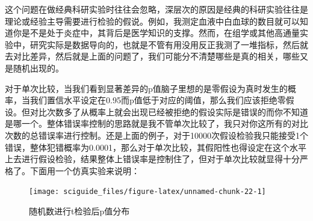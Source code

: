 \documentclass[]{tufte-book}
\newenvironment{Shaded}{}{}
\newcommand{\AttributeTok}[1]{\textcolor[rgb]{0.49,0.56,0.16}{#1}}
\newcommand{\CommentTok}[1]{\textcolor[rgb]{0.38,0.63,0.69}{\textit{#1}}}
\newcommand{\ConstantTok}[1]{\textcolor[rgb]{0.53,0.00,0.00}{#1}}
\newcommand{\ControlFlowTok}[1]{\textcolor[rgb]{0.00,0.44,0.13}{\textbf{#1}}}
\newcommand{\DecValTok}[1]{\textcolor[rgb]{0.25,0.63,0.44}{#1}}
\newcommand{\FunctionTok}[1]{\textcolor[rgb]{0.02,0.16,0.49}{#1}}
\newcommand{\NormalTok}[1]{#1}
\newcommand{\OtherTok}[1]{\textcolor[rgb]{0.00,0.44,0.13}{#1}}
\newcommand{\SpecialCharTok}[1]{\textcolor[rgb]{0.25,0.44,0.63}{#1}}
\newcommand{\StringTok}[1]{\textcolor[rgb]{0.25,0.44,0.63}{#1}}
\begin{document}
这个问题在做经典科研实验时往往会忽略，深层次的原因是经典的科研实验往往是理论或经验主导需要进行检验的假说。例如，我测定血液中白血球的数目就可以知道你是不是处于炎症中，其背后是医学知识的支撑。然而，在组学或其他高通量实验中，研究实际是数据导向的，也就是不管有用没用反正我测了一堆指标，然后就去对比差异，然后就是上面的问题了，我们可能分不清楚哪些是真的相关，哪些又是随机出现的。

对于单次比较，当我们看到显著差异的p值脑子里想的是零假设为真时发生的概率，当我们置信水平设定在0.95而p值低于对应的阈值，那么我们应该拒绝零假设。但对比次数多了从概率上就会出现已经被拒绝的假设实际是错误的而你不知道是哪一个。整体错误率控制的思路就是我不管单次比较了，我只对你这所有的对比次数的总错误率进行控制。还是上面的例子，对于10000次假设检验我只能接受1个错误，整体犯错概率为0.0001，那么对于单次比较，其假阳性也得设定在这个水平上去进行假设检验，结果整体上错误率是控制住了，但对于单次比较就显得十分严格了。下面用一个仿真实验来说明：

\begin{Shaded}
\end{Shaded}

\begin{figure}
\texttt{[image: sciguide\_files/figure-latex/unnamed-chunk-22-1]} \caption[随机数进行t检验后p值分布]{随机数进行t检验后p值分布}\label{fig:unnamed-chunk-22}
\end{figure}
\end{document}
